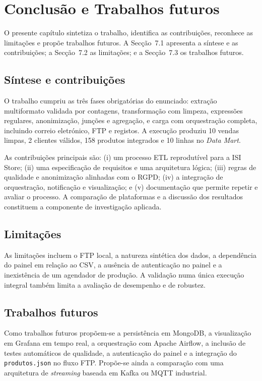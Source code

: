 \documentclass[11pt,a4paper]{article}
\begin{document}
\section{Conclusão e Trabalhos futuros}
O presente capítulo sintetiza o trabalho, identifica as contribuições, reconhece as limitações e propõe trabalhos futuros. A Secção~7.1 apresenta a síntese e as contribuições; a Secção~7.2 as limitações; e a Secção~7.3 os trabalhos futuros.

\subsection{Síntese e contribuições}
O trabalho cumpriu as três fases obrigatórias do enunciado: extração multiformato validada por contagens, transformação com limpeza, expressões regulares, anonimização, junções e agregação, e carga com orquestração completa, incluindo correio eletrónico, FTP e registos. A execução produziu 10 vendas limpas, 2 clientes válidos, 158 produtos integrados e 10 linhas no \textit{Data Mart}.

As contribuições principais são: (i) um processo ETL reprodutível para a ISI Store; (ii) uma especificação de requisitos e uma arquitetura lógica; (iii) regras de qualidade e anonimização alinhadas com o RGPD; (iv) a integração de orquestração, notificação e visualização; e (v) documentação que permite repetir e avaliar o processo. A comparação de plataformas e a discussão dos resultados constituem a componente de investigação aplicada.

\subsection{Limitações}
As limitações incluem o FTP local, a natureza sintética dos dados, a dependência do painel em relação ao CSV, a ausência de autenticação no painel e a inexistência de um agendador de produção. A validação numa única execução integral também limita a avaliação de desempenho e de robustez.

\subsection{Trabalhos futuros}
Como trabalhos futuros propõem-se a persistência em MongoDB, a visualização em Grafana em tempo real, a orquestração com Apache Airflow, a inclusão de testes automáticos de qualidade, a autenticação do painel e a integração do \texttt{produtos.json} no fluxo FTP. Propõe-se ainda a comparação com uma arquitetura de \textit{streaming} baseada em Kafka ou MQTT industrial.
\end{document}
